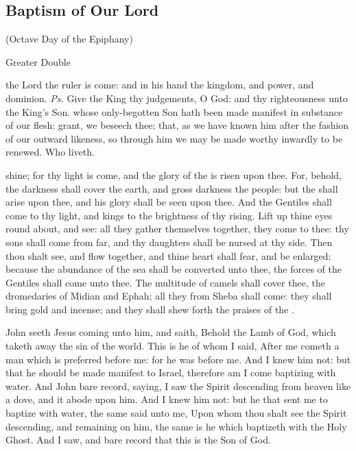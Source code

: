 \clearpage
\subsection{Baptism of Our Lord}

\centerline{\small{(Octave Day of the Epiphany)}}

\begin{inhead}
{Greater Double}
\end{inhead}


\introit
{} the Lord the ruler is come: and in his hand the kingdom, and power, and dominion. \textit{Ps.} Give the King thy judgements, O God: and thy righteousness unto the King's Son.
\collect
{} whose only-begotten Son hath been made manifest in substance of our flesh: grant, we beseech thee; that, as we have known him after the fashion of our outward likeness, so through him we may be made worthy inwardly to be renewed. Who liveth.

 shine; for thy light is come, and the glory of the  is risen upon thee. For, behold, the darkness shall cover the earth, and gross darkness the people: but the  shall arise upon thee, and his glory shall be seen upon thee. And the Gentiles shall come to thy light, and kings to the brightness of thy rising. Lift up thine eyes round about, and see: all they gather themselves together, they come to thee: thy sons shall come from far, and thy daughters shall be nursed at thy side. Then thou shalt see, and flow together, and thine heart shall fear, and be enlarged; because the abundance of the sea shall be converted unto thee, the forces of the Gentiles shall come unto thee. The multitude of camels shall cover thee, the dromedaries of Midian and Ephah; all they from Sheba shall come: they shall bring gold and incense; and they shall shew forth the praises of the .


 John seeth Jesus coming unto him, and saith, Behold the Lamb of God, which taketh away the sin of the world. This is he of whom I said, After me cometh a man which is preferred before me: for he was before me. And I knew him not: but that he should be made manifest to Israel, therefore am I come baptizing with water. And John bare record, saying, I saw the Spirit descending from heaven like a dove, and it abode upon him. And I knew him not: but he that sent me to baptize with water, the same said unto me, Upon whom thou shalt see the Spirit descending, and remaining on him, the same is he which baptizeth with the Holy Ghost. And I saw, and bare record that this is the Son of God.

